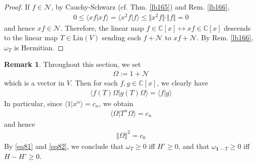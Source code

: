 \documentclass[12pt,b5paper,notitlepage]{article}
\theoremstyle{definition}
\newtheorem{rem}[df]{Remark}
\theoremstyle{plain}
\newcommand{\idt}{\mathbf{1}}
\newcommand{\bk}[1]{\langle {#1}\rangle}
\newcommand{\scr}{\mathscr}
\newcommand{\Cbb}{\mathbb C}
\newcommand{\Lin}{\mathrm{Lin}}
\numberwithin{equation}{section}
\begin{document}
\begin{proof}
If $f\in\scr N$, by Cauchy-Schwarz (cf. Thm. \ref{lb165}) and Rem. \ref{lb166},
\begin{align*}
0\leq\bk{xf|xf}=\bk{x^2f|f}\leq\Vert x^2f\Vert\cdot\Vert f\Vert=0
\end{align*}
and hence $xf\in\scr N$. Therefore, the linear map $f\in\Cbb[x]\mapsto xf\in\Cbb[x]$ descends to the linear map $T\in\Lin(V)$ sending each $f+\scr N$ to $xf+\scr N$. By Rem. \ref{lb166}, $\omega_T$ is Hermitian. 
\end{proof}







\begin{rem}\label{lb170}
Throughout this section, we set
\begin{align*}
\Omega:=1+\scr N
\end{align*}
which is a vector in $V$. Then for each $f,g\in\Cbb[x]$, we clearly have
\begin{align}\label{eq233}
\bk{f(T)\Omega|g(T)\Omega}=\bk{f|g}
\end{align}
In particular, since $\bk{1|x^n}=c_n$, we obtain
\begin{align}\label{eq85}
\bk{\Omega|T^n\Omega}=c_n
\end{align} 
and hence
\begin{align}\label{eq86}
\Vert \Omega\Vert^2=c_0
\end{align}
By \eqref{eq81} and \eqref{eq82}, we conclude that $\omega_T\geq0$ iff $H'\geq0$, and that $\omega_{\idt-T}\geq0$ iff $H-H'\geq0$. 
\end{rem}
\end{document}
